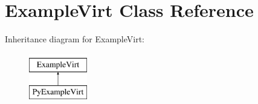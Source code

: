 \hypertarget{class_example_virt}{}\section{Example\+Virt Class Reference}
\label{class_example_virt}
Inheritance diagram for Example\+Virt\+:\begin{figure}[H]
\begin{center}
\leavevmode
\includegraphics[height=2.000000cm]{class_example_virt}
\end{center}
\end{figure}
